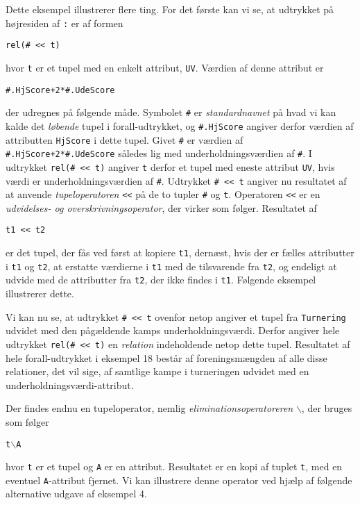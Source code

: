 Dette eksempel illustrerer flere ting. For det f\o{}rste kan vi se, at
udtrykket p\aa{} h\o{}jresiden af \verb":" er af formen
\begin{center}
\verb"rel(# << t)"
\end{center}
hvor \verb"t" er et tupel med en enkelt attribut, \verb"UV".
V\ae{}rdien af denne attribut er
\begin{center}
\verb"#.HjScore+2*#.UdeScore"
\end{center}
der udregnes p\aa{} f\o{}lgende m\aa{}de.
Symbolet \verb"#" er {\em standardnavnet\/} p\aa{} hvad vi kan kalde
det {\em l\o{}bende\/} tupel i forall-udtrykket, og
\verb"#.HjScore" angiver derfor v\ae{}rdien af attributten
\verb"HjScore" i dette tupel. Givet \verb"#" er v\ae{}rdien af
\verb"#.HjScore+2*#.UdeScore" s\aa{}ledes lig med underholdnings\-v\ae{}rdien
af \verb"#". I udtrykket \verb"rel(# << t)" angiver \verb"t" derfor
et tupel med eneste attribut \verb"UV", hvis v\ae{}rdi er
underholdningsv\ae{}rdien af \verb"#". Udtrykket \verb"# << t"
angiver nu resultatet af at anvende {\em tupeloperatoren\/}
\verb"<<" p\aa{} de to tupler \verb"#" og \verb"t". Operatoren
\verb"<<" er en {\em udvidelses- og overskrivningsoperator}, der virker
som f\o{}lger. Resultatet af
\begin{center}
\verb"t1 << t2"
\end{center}
er det tupel, der f\aa{}s ved f\o{}rst at kopiere \verb"t1",
dern\ae{}st, hvis der er f\ae{}lles attributter i \verb"t1" og \verb"t2",
at erstatte v\ae{}rdierne i \verb"t1" med de tilsvarende fra \verb"t2",
og endeligt at udvide med de attributter fra \verb"t2", der ikke findes
i \verb"t1". F\o{}lgende eksempel illustrerer dette.


Vi kan nu se, at udtrykket \verb"# << t" ovenfor netop angiver et tupel
fra \verb"Turnering" udvidet med den p\aa{}g\ae{}ldende kamps
underholdningsv\ae{}rdi. Derfor angiver hele udtrykket
\verb"rel(# << t)" en {\em relation\/} indeholdende netop dette tupel.
Resultatet af hele forall-udtrykket i eksempel 18 best\aa{}r af
foreningsm\ae{}ngden af alle disse relationer, det vil sige,
af samtlige kampe i turneringen udvidet med en
underholdningsv\ae{}rdi-attribut.

Der findes endnu en tupeloperator, nemlig {\em eliminationsoperatoreren\/}
$\backslash$, der bruges som f\o{}lger
\begin{center}
\verb"t"$\backslash$\verb"A"
\end{center}
hvor \verb"t" er et tupel og \verb"A" er en attribut. Resultatet er
en kopi af tuplet \verb"t", med en eventuel \verb"A"-attribut fjernet.
Vi kan illustrere denne operator ved hj\ae{}lp af f\o{}lgende alternative
udgave af eksempel 4.

